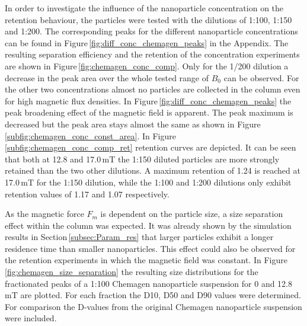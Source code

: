In order to investigate the influence of the nanoparticle concentration on the retention behaviour, the particles were tested with the dilutions of 1:100, 1:150 and 1:200. The corresponding peaks for the different nanoparticle concentrations can be found in Figure\,\ref{fig:diff_conc_chemagen_peaks} in the Appendix. The resulting separation efficiency and the retention of the concentration experiments are shown in Figure\,\ref{fig:chemagen_conc_comp}. Only for the 1/200 dilution a decrease in the peak area over the whole tested range of $B_{0}$ can be observed. For the other two concentrations almost no particles are collected in the column even for high magnetic flux densities. In Figure\,\ref{fig:diff_conc_chemagen_peaks} the peak broadening effect of the magnetic field is apparent. The peak maximum is decreased but the peak area stays almost the same as shown in Figure\,\ref{subfig:chemagen_conc_const_area}. In Figure\,\ref{subfig:chemagen_conc_comp_ret} retention curves are depicted. It can be seen that both at 12.8 and 17.0\,mT the 1:150 diluted particles are more strongly retained than the two other dilutions. A maximum retention of 1.24 is reached at 17.0\,mT for the 1:150 dilution, while the 1:100 and 1:200 dilutions only exhibit retention values of 1.17 and 1.07 respectively. 

As the magnetic force $F_{m}$ is dependent on the particle size, a size separation effect within the column was expected. It was already shown by the simulation results in Section\,\ref{subsec:Param_res} that larger particles exhibit a longer residence time than smaller nanoparticles. This effect could also be observed for the retention experiments in which the magnetic field was constant. In Figure\,\ref{fig:chemagen_size_separation} the resulting size distributions for the fractionated peaks of a 1:100 Chemagen nanoparticle suspension for 0 and 12.8\,mT are plotted. For each fraction the D10, D50 and D90 values were determined. For comparison the D-values from the original Chemagen nanoparticle suspension were included. 

